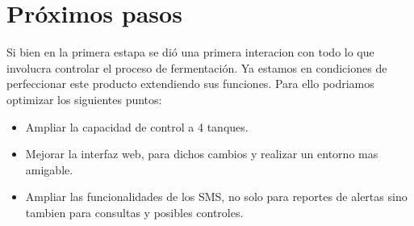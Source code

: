 \section{Próximos pasos}

Si bien en la primera estapa se dió una primera interacion con todo lo que involucra controlar el proceso de fermentación. Ya estamos en condiciones de perfeccionar este producto extendiendo sus funciones.
Para ello podriamos optimizar los siguientes puntos:
  \begin{itemize}
    \item Ampliar la capacidad de control a 4 tanques.
    \item Mejorar la interfaz web, para dichos cambios y realizar un entorno mas amigable.
    \item Ampliar las funcionalidades de los SMS, no solo para reportes de alertas sino tambien para consultas y posibles controles. 
   \end{itemize} 


